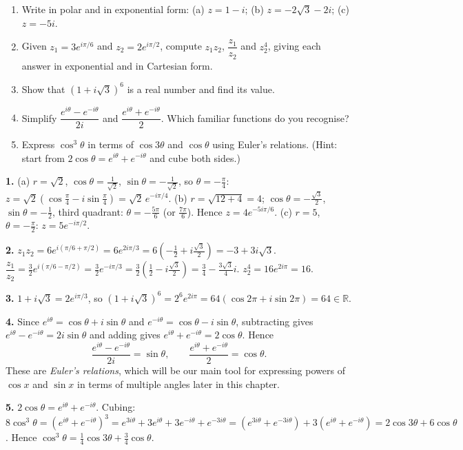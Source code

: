 \documentclass[11pt]{article}
\begin{document}
\begin{exercice}[Practice]
\begin{enumerate}
\item Write in polar and in exponential form: (a) $z = 1 - i$; (b) $z = -2\sqrt3 - 2i$; (c) $z = -5i$.
\item Given $z_1 = 3e^{i\pi/6}$ and $z_2 = 2e^{i\pi/2}$, compute $z_1z_2$, $\dfrac{z_1}{z_2}$ and $z_2^{4}$, giving each answer in exponential and in Cartesian form.
\item Show that $(1+i\sqrt3)^{6}$ is a real number and find its value.
\item Simplify $\dfrac{e^{i\theta}-e^{-i\theta}}{2i}$ and $\dfrac{e^{i\theta}+e^{-i\theta}}{2}$. Which familiar functions do you recognise?
\item Express $\cos^3\theta$ in terms of $\cos3\theta$ and $\cos\theta$ using Euler's relations. (Hint: start from $2\cos\theta = e^{i\theta}+e^{-i\theta}$ and cube both sides.)
\end{enumerate}
\end{exercice}

\begin{corrige}[Exercise 1]
\textbf{1.} (a) $r = \sqrt2$, $\cos\theta = \frac{1}{\sqrt2}$, $\sin\theta = -\frac{1}{\sqrt2}$, so $\theta = -\frac{\pi}{4}$: $z = \sqrt2\left(\cos\frac{\pi}{4} - i\sin\frac{\pi}{4}\right) = \sqrt2\,e^{-i\pi/4}$.
(b) $r = \sqrt{12+4} = 4$; $\cos\theta = -\frac{\sqrt3}{2}$, $\sin\theta = -\frac12$, third quadrant: $\theta = -\frac{5\pi}{6}$ (or $\frac{7\pi}{6}$). Hence $z = 4e^{-5i\pi/6}$.
(c) $r = 5$, $\theta = -\frac{\pi}{2}$: $z = 5e^{-i\pi/2}$.

\textbf{2.} $z_1z_2 = 6e^{i(\pi/6+\pi/2)} = 6e^{2i\pi/3} = 6\left(-\frac12 + i\frac{\sqrt3}{2}\right) = -3 + 3i\sqrt3$.
$\dfrac{z_1}{z_2} = \frac32 e^{i(\pi/6-\pi/2)} = \frac32 e^{-i\pi/3} = \frac32\left(\frac12 - i\frac{\sqrt3}{2}\right) = \frac34 - \frac{3\sqrt3}{4}i$.
$z_2^{4} = 16e^{2i\pi} = 16$.

\textbf{3.} $1+i\sqrt3 = 2e^{i\pi/3}$, so $(1+i\sqrt3)^{6} = 2^{6}e^{2i\pi} = 64(\cos 2\pi + i\sin 2\pi) = 64 \in \mathbb{R}$.

\textbf{4.} Since $e^{i\theta} = \cos\theta + i\sin\theta$ and $e^{-i\theta} = \cos\theta - i\sin\theta$, subtracting gives $e^{i\theta}-e^{-i\theta} = 2i\sin\theta$ and adding gives $e^{i\theta}+e^{-i\theta} = 2\cos\theta$. Hence
\[
\frac{e^{i\theta}-e^{-i\theta}}{2i} = \sin\theta, \qquad \frac{e^{i\theta}+e^{-i\theta}}{2} = \cos\theta.
\]
These are \emph{Euler's relations}, which will be our main tool for expressing powers of $\cos x$ and $\sin x$ in terms of multiple angles later in this chapter.

\textbf{5.} $2\cos\theta = e^{i\theta}+e^{-i\theta}$. Cubing: $8\cos^3\theta = (e^{i\theta}+e^{-i\theta})^3 = e^{3i\theta} + 3e^{i\theta} + 3e^{-i\theta} + e^{-3i\theta} = (e^{3i\theta}+e^{-3i\theta}) + 3(e^{i\theta}+e^{-i\theta}) = 2\cos3\theta + 6\cos\theta$. Hence $\cos^3\theta = \frac{1}{4}\cos3\theta + \frac{3}{4}\cos\theta$.
\end{corrige}
\end{document}

